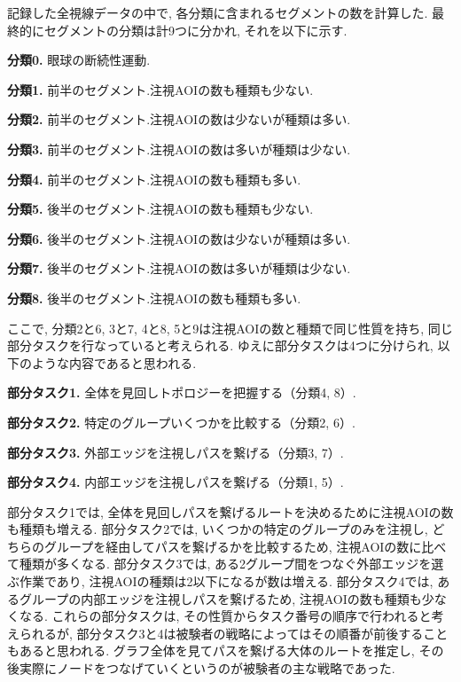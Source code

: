\documentclass{kuee}
\begin{document}
記録した全視線データの中で, 各分類に含まれるセグメントの数を計算した.
最終的にセグメントの分類は計9つに分かれ, それを以下に示す.
\begin{description}
  \item{\bf 分類0.} 眼球の断続性運動.
  \item{\bf 分類1.} 前半のセグメント.注視AOIの数も種類も少ない.
  \item{\bf 分類2.} 前半のセグメント.注視AOIの数は少ないが種類は多い.
  \item{\bf 分類3.} 前半のセグメント.注視AOIの数は多いが種類は少ない.
  \item{\bf 分類4.} 前半のセグメント.注視AOIの数も種類も多い.
  \item{\bf 分類5.} 後半のセグメント.注視AOIの数も種類も少ない.
  \item{\bf 分類6.} 後半のセグメント.注視AOIの数は少ないが種類は多い.
  \item{\bf 分類7.} 後半のセグメント.注視AOIの数は多いが種類は少ない.
  \item{\bf 分類8.} 後半のセグメント.注視AOIの数も種類も多い.
\end{description}
ここで, 分類2と6, 3と7, 4と8, 5と9は注視AOIの数と種類で同じ性質を持ち, 同じ部分タスクを行なっていると考えられる.
ゆえに部分タスクは4つに分けられ, 以下のような内容であると思われる.
\begin{description}
  \item{\bf 部分タスク1.} 全体を見回しトポロジーを把握する（分類4, 8）.
  \item{\bf 部分タスク2.} 特定のグループいくつかを比較する（分類2, 6）.
  \item{\bf 部分タスク3.} 外部エッジを注視しパスを繋げる（分類3, 7）.
  \item{\bf 部分タスク4.} 内部エッジを注視しパスを繋げる（分類1, 5）.
\end{description}
部分タスク1では, 全体を見回しパスを繋げるルートを決めるために注視AOIの数も種類も増える.
部分タスク2では, いくつかの特定のグループのみを注視し, どちらのグループを経由してパスを繋げるかを比較するため, 注視AOIの数に比べて種類が多くなる.
部分タスク3では, ある2グループ間をつなぐ外部エッジを選ぶ作業であり, 注視AOIの種類は2以下になるが数は増える.
部分タスク4では, あるグループの内部エッジを注視しパスを繋げるため, 注視AOIの数も種類も少なくなる.
これらの部分タスクは, その性質からタスク番号の順序で行われると考えられるが, 部分タスク3と4は被験者の戦略によってはその順番が前後することもあると思われる.
グラフ全体を見てパスを繋げる大体のルートを推定し, その後実際にノードをつなげていくというのが被験者の主な戦略であった.
\end{document}
